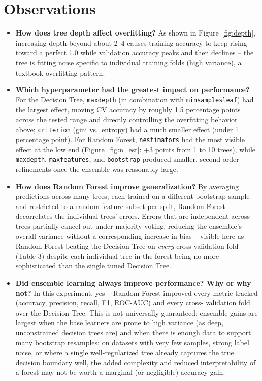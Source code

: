 \documentclass[12pt,a4paper]{article}
\DeclareRobustCommand{\_}{\textunderscore\allowbreak}
\begin{document}
\section{Observations}
\begin{itemize}
\item \textbf{How does tree depth affect overfitting?} As shown in
Figure~\ref{fig:depth}, increasing depth beyond about 2--4 causes training
accuracy to keep rising toward a perfect 1.0 while validation accuracy
peaks and then declines -- the tree is fitting noise specific to individual
training folds (high variance), a textbook overfitting pattern.
\item \textbf{Which hyperparameter had the greatest impact on
performance?} For the Decision Tree, \texttt{max\_depth} (in combination
with \texttt{min\_samples\_leaf}) had the largest effect, moving CV
accuracy by roughly 1.5 percentage points across the tested range and
directly controlling the overfitting behavior above; \texttt{criterion}
(gini vs.\ entropy) had a much smaller effect (under 1 percentage point).
For Random Forest, \texttt{n\_estimators} had the most visible effect at
the low end (Figure~\ref{fig:n_est}: +3 points from 1 to 10 trees), while
\texttt{max\_depth}, \texttt{max\_features}, and \texttt{bootstrap} produced
smaller, second-order refinements once the ensemble was reasonably large.
\item \textbf{How does Random Forest improve generalization?} By
averaging predictions across many trees, each trained on a different
bootstrap sample and restricted to a random feature subset per split,
Random Forest decorrelates the individual trees' errors. Errors that are
independent across trees partially cancel out under majority voting,
reducing the ensemble's overall variance without a corresponding increase
in bias -- visible here as Random Forest beating the Decision Tree on
\emph{every} cross-validation fold (Table 3) despite each individual tree
in the forest being no more sophisticated than the single tuned Decision
Tree.
\item \textbf{Did ensemble learning always improve performance? Why or why
not?} In this experiment, yes -- Random Forest improved every metric
tracked (accuracy, precision, recall, F1, ROC-AUC) and every cross-
validation fold over the Decision Tree. This is not universally guaranteed:
ensemble gains are largest when the base learners are prone to high
variance (as deep, unconstrained decision trees are) and when there is
enough data to support many bootstrap resamples; on datasets with very few
samples, strong label noise, or where a single well-regularized tree
already captures the true decision boundary well, the added complexity and
reduced interpretability of a forest may not be worth a marginal (or
negligible) accuracy gain.
\end{itemize}
\end{document}
